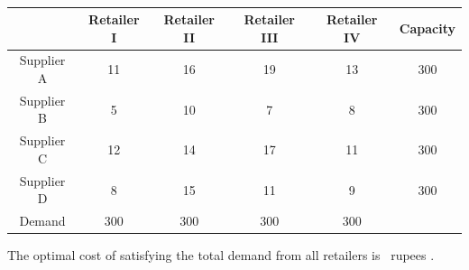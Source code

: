 \documentclass[journal]{IEEEtran}
\begin{document}
\begin{enumerate}[leftmargin=0pt]
\begin{table}[h]
\centering
\begin{tabular}{|c|c|c|c|c|c|} \hline
         & Retailer I & Retailer II & Retailer III & Retailer IV & Capacity \\
\hline
Supplier A & 11 & 16 & 19 & 13 & 300 \\
Supplier B & 5  & 10 & 7  & 8  & 300 \\
Supplier C & 12 & 14 & 17 & 11 & 300 \\
Supplier D & 8  & 15 & 11 & 9  & 300 \\
\hline
Demand    & 300 & 300 & 300 & 300 & \\
\hline
\end{tabular}
\caption*{}
\label{tab:Q65}
\end{table}

The optimal cost of satisfying the total demand from all retailers is \underline{\hspace{2cm}}~rupees .

\hfill{}


\end{enumerate}
\end{document}
